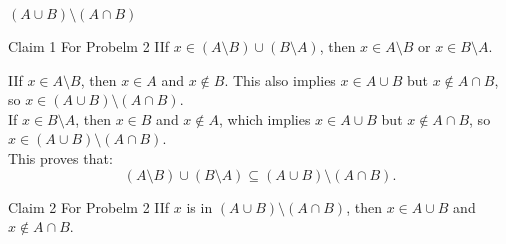 \documentclass{report}
\begin{document}
\begin{center}
    {\footnotesize $(A \cup B) \setminus (A \cap B)$}\\[5pt]
\end{center}
  
\begin{ClaimWithMagnolia}{Claim 1 For Probelm 2}
    IIf $x \in \left(A \setminus B\right) \cup \left(B \setminus A \right)$, then $x \in A \setminus B$ or $x \in B \setminus A$.
\end{ClaimWithMagnolia}

\begin{RemarkWithLily}{1}
    IIf $x \in A \setminus B$, then $x \in A$ and $x \notin B$. This also implies $x \in A \cup B$ but $x \notin A \cap B$, so $x \in (A \cup B) \setminus (A \cap B)$. \\
    If $x \in B \setminus A$, then $x \in B$ and $x \notin A$, which implies $x \in A \cup B$ but $x \notin A \cap B$, so $x \in (A \cup B) \setminus (A \cap B)$. \\
    
    This proves that:
    \[
    \left(A \setminus B\right) \cup \left(B \setminus A \right) \subseteq \left( A \cup B \right) \setminus \left( A \cap B \right).
    \]
\end{RemarkWithLily}

\begin{ClaimWithMagnolia}{Claim 2 For Probelm 2}
    IIf $x$ is in $\left( A \cup B \right) \setminus \left( A \cap B \right)$, then $x \in A \cup B$ and $x \notin A \cap B$.
\end{ClaimWithMagnolia}
\end{document}
